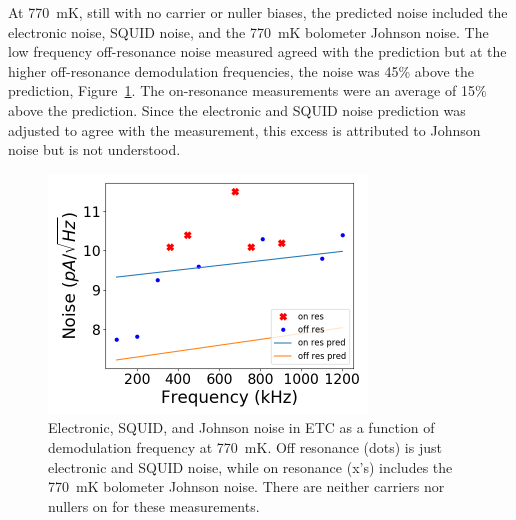 At 770~mK, still with no carrier or nuller biases, the predicted noise included the electronic noise, \ac{SQUID} noise, and the 770~mK bolometer Johnson noise. 
The low frequency off-resonance noise measured agreed with the prediction but at the higher off-resonance demodulation frequencies, the noise was 45\% above the prediction, Figure~\ref{fig:770mK_squid_noise}. 
The on-resonance measurements were an average of 15\% above the prediction. 
Since the electronic and \ac{SQUID} noise prediction was adjusted to agree with the measurement, this excess is attributed to Johnson noise but is not understood. 

\begin{figure}[ht!]
\begin{center}
\includegraphics[height=2.5in]{figures/squid_noise_770mK.png}
\caption{Electronic, \ac{SQUID}, and Johnson noise in \ac{ETC} as a function of demodulation frequency at 770~mK. Off resonance (dots) is just electronic and \ac{SQUID} noise, while on resonance (x's) includes the 770~mK bolometer Johnson noise. There are neither carriers nor nullers on for these measurements. 
\label{fig:770mK_squid_noise} }
\end{center}
\end{figure}





